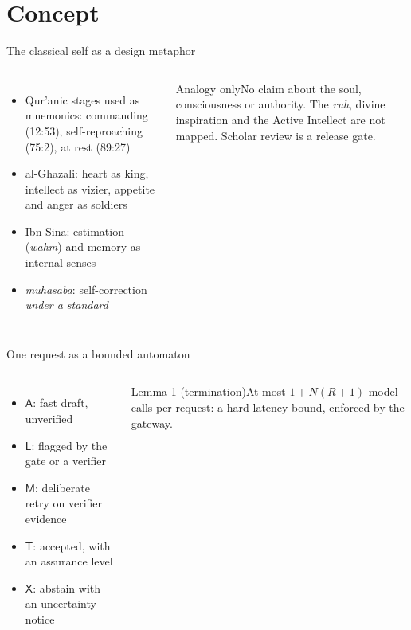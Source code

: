 \documentclass[aspectratio=169,10pt]{beamer}
\begin{document}
\section{Concept}
\begin{frame}{The classical self as a design metaphor}
\begin{columns}[T]
\centering\scalebox{0.78}{}
\scriptsize
\begin{itemize}
\item Qur'anic stages used as mnemonics: commanding (12:53), self-reproaching (75:2), at rest (89:27)
\item al-Ghazali: heart as king, intellect as vizier, appetite and anger as soldiers
\item Ibn Sina: estimation (\emph{wahm}) and memory as internal senses
\item \emph{muhasaba}: self-correction \emph{under a standard}
\end{itemize}
\begin{alertblock}{Analogy only}No claim about the soul, consciousness or authority. The \emph{ruh}, divine inspiration and the Active Intellect are not mapped. Scholar review is a release gate.\end{alertblock}
\end{columns}
\end{frame}

\begin{frame}{One request as a bounded automaton}
\begin{columns}[T]
\centering\scalebox{0.88}{}
\small
\begin{itemize}
\item $\mathsf A$: fast draft, unverified
\item $\mathsf L$: flagged by the gate or a verifier
\item $\mathsf M$: deliberate retry on verifier evidence
\item $\mathsf T$: accepted, with an assurance level
\item $\mathsf X$: abstain with an uncertainty notice
\end{itemize}
\begin{block}{Lemma 1 (termination)}At most $1+N(R{+}1)$ model calls per request: a hard latency bound, enforced by the gateway.\end{block}
\end{columns}
\end{frame}
\end{document}
